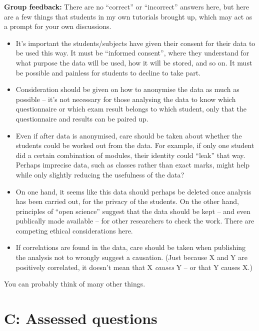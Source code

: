 \documentclass[
  a4paper,
]{book}
\providecommand{\tightlist}{%
  \setlength{\itemsep}{0pt}\setlength{\parskip}{0pt}}
\theoremstyle{definition}
\theoremstyle{definition}
\theoremstyle{definition}
\theoremstyle{definition}
\theoremstyle{remark}
\begin{document}
\begin{myanswers}
\textbf{Group feedback:} There are no ``correct'' or ``incorrect'' answers here, but here are a few things that students in my own tutorials brought up, which may act as a prompt for your own discussions.

\begin{itemize}
\tightlist
\item
  It's important the students/subjects have given their consent for their data to be used this way. It must be ``informed consent'', where they understand for what purpose the data will be used, how it will be stored, and so on. It must be possible and painless for students to decline to take part.
\item
  Consideration should be given on how to anonymise the data as much as possible -- it's not necessary for those analysing the data to know which questionnaire or which exam result belongs to which student, only that the questionnaire and results can be paired up.
\item
  Even if after data is anonymised, care should be taken about whether the students could be worked out from the data. For example, if only one student did a certain combination of modules, their identity could ``leak'' that way. Perhaps imprecise data, such as classes rather than exact marks, might help while only slightly reducing the usefulness of the data?
\item
  On one hand, it seems like this data should perhaps be deleted once analysis has been carried out, for the privacy of the students. On the other hand, principles of ``open science'' suggest that the data should be kept -- and even publically made available -- for other researchers to check the work. There are competing ethical considerations here.
\item
  If correlations are found in the data, care should be taken when publishing the analysis not to wrongly suggest a causation. (Just because X and Y are positively correlated, it doesn't mean that X \emph{causes} Y -- or that Y causes X.)
\end{itemize}

You can probably think of many other things.

\end{myanswers}

\hypertarget{P1-assessed}{%
\section*{C: Assessed questions}\label{P1-assessed}}
\end{document}
